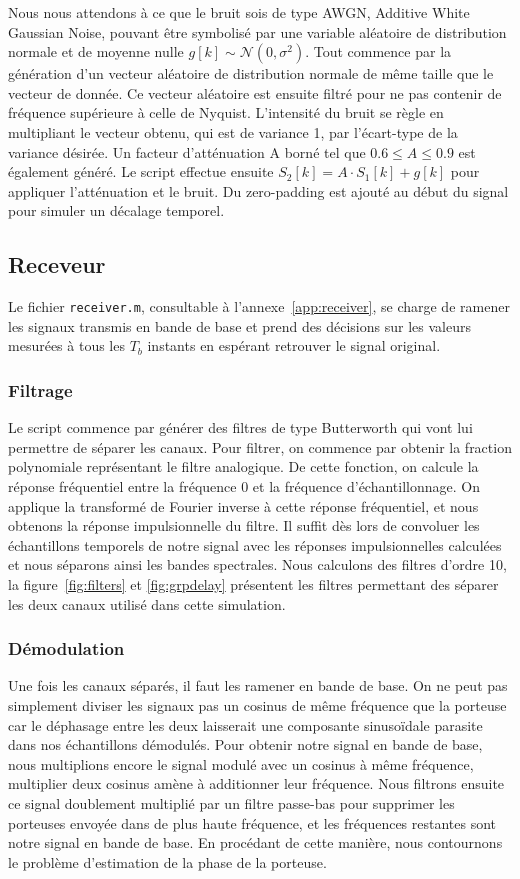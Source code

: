 \documentclass[10pt, oneside, a4paper]{article}
\begin{document}
Nous nous attendons à ce que le bruit sois de type AWGN, Additive White Gaussian Noise, pouvant être symbolisé par une variable aléatoire de distribution normale et de moyenne nulle $g[k]\sim\mathcal{N}(0,\sigma^2)$.
Tout commence par la génération d'un vecteur aléatoire de distribution normale de même taille que le vecteur de donnée.
Ce vecteur aléatoire est ensuite filtré pour ne pas contenir de fréquence supérieure à celle de Nyquist.
L'intensité du bruit se règle en multipliant le vecteur obtenu, qui est de variance 1, par l'écart-type de la variance désirée.
Un facteur d'atténuation A borné tel que $\num{0.6} \leq A \leq \num{0.9}$ est également généré.
Le script effectue ensuite $S_2[k] = A \cdot S_1[k] + g[k]$ pour appliquer l'atténuation et le bruit.
Du \og{}zero-padding\fg{} est ajouté au début du signal pour simuler un décalage temporel.

\subsection{Receveur}
Le fichier \texttt{receiver.m}, consultable à l'annexe~\ref{app:receiver}, se charge de ramener les signaux transmis en bande de base et prend des décisions sur les valeurs mesurées à tous les $T_b$ instants en espérant retrouver le signal original.

\subsubsection{Filtrage}
Le script commence par générer des filtres de type Butterworth qui vont lui permettre de séparer les canaux.
Pour filtrer, on commence par obtenir la fraction polynomiale représentant le filtre analogique.
De cette fonction, on calcule la réponse fréquentiel entre la fréquence 0 et la fréquence d'échantillonnage.
On applique la transformé de Fourier inverse à cette réponse fréquentiel, et nous obtenons la réponse impulsionnelle du filtre.
Il suffit dès lors de convoluer les échantillons temporels de notre signal avec les réponses impulsionnelles calculées et nous séparons ainsi les bandes spectrales.
Nous calculons des filtres d'ordre 10, la figure~\ref{fig:filters} et \ref{fig:grpdelay} présentent les filtres permettant des séparer les deux canaux utilisé dans cette simulation.

\subsubsection{Démodulation}
Une fois les canaux séparés, il faut les ramener en bande de base.
On ne peut pas simplement diviser les signaux pas un cosinus de même fréquence que la porteuse car le déphasage entre les deux laisserait une composante sinusoïdale parasite dans nos échantillons démodulés.
Pour obtenir notre signal en bande de base, nous multiplions encore le signal modulé avec un cosinus à même fréquence, multiplier deux cosinus amène à additionner leur fréquence.
Nous filtrons ensuite ce signal doublement multiplié par un filtre passe-bas pour supprimer les porteuses envoyée dans de plus haute fréquence, et les fréquences restantes sont notre signal en bande de base.
En procédant de cette manière, nous contournons le problème d'estimation de la phase de la porteuse.
\end{document}
